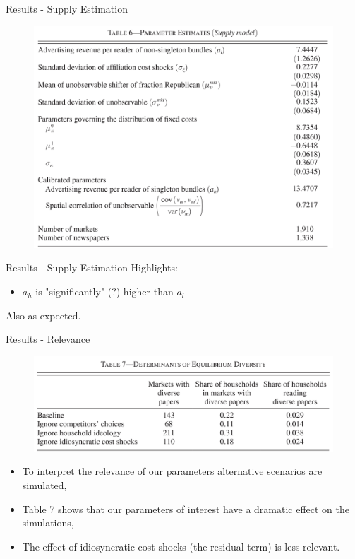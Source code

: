 \documentclass{beamer}
\begin{document}
\begin{frame}[t]{Results - Supply Estimation}
  \begin{figure}
  \begin{center}
    \includegraphics[scale=0.15]{Table6.png}
  \end{center}
  \end{figure}
\end{frame}

\begin{frame}[t]{Results - Supply Estimation}
  Highlights:
  \begin{itemize}
    \item $a_h$ is "significantly" (?) higher than $a_l$
  \end{itemize}

  Also as expected.
\end{frame}

\begin{frame}[t]{Results - Relevance}
  \begin{figure}
  \begin{center}
    \includegraphics[scale=0.15]{Table7.png}
  \end{center}
  \end{figure}

  \begin{itemize}
    \item To interpret the relevance of our parameters alternative scenarios are
      simulated,
    \item Table 7 shows that our parameters of interest have a dramatic effect
      on the simulations,
    \item The effect of idiosyncratic cost shocks (the residual term) is 
      less relevant.
  \end{itemize}
\end{frame}
\end{document}
